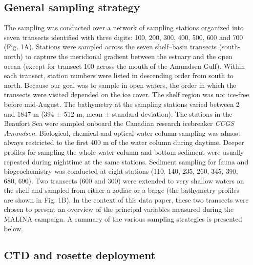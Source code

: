 \documentclass[essd, manuscript]{copernicus}
\begin{document}
\subsection{General sampling strategy}

The sampling was conducted over a network of sampling stations organized into seven transects identified with three digits: 100, 200, 300, 400, 500, 600 and 700 (Fig. 1A). Stations were sampled across the seven shelf–basin transects (south-north) to capture the meridional gradient between the estuary and the open ocean (except for transect 100 across the mouth of the Amundsen Gulf). Within each transect, station numbers were listed in descending order from south to north. Because our goal was to sample in open waters, the order in which the transects were visited depended on the ice cover. The shelf region was not ice-free before mid-August. The bathymetry at the sampling stations varied between 2 and 1847 m (394 $\pm$ 512 m, mean $\pm$ standard deviation). The stations in the Beaufort Sea were sampled onboard the Canadian research icebreaker \textit{CCGS Amundsen}. Biological, chemical and optical water column sampling was almost always restricted to the first 400 m of the water column during daytime. Deeper profiles for sampling the whole water column and bottom sediment were usually repeated during nighttime at the same stations. Sediment sampling for fauna and biogeochemistry was conducted at eight stations (110, 140, 235, 260, 345, 390, 680, 690). Two transects (600 and 300) were extended to very shallow waters on the shelf and sampled from either a zodiac or a barge (the bathymetry profiles are shown in Fig. 1B). In the context of this data paper, these two transects were chosen to present an overview of the principal variables measured during the MALINA campaign. A summary of the various sampling strategies is presented below.

\subsection{CTD and rosette deployment}
\end{document}
